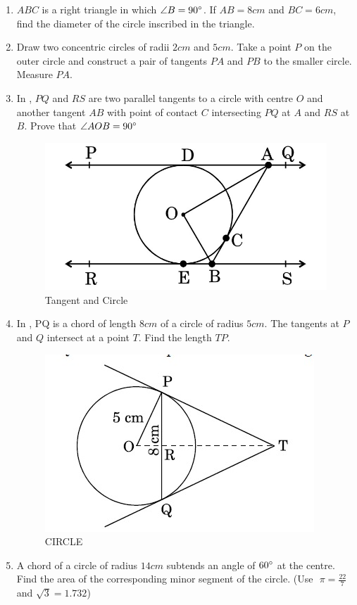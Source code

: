 \begin{enumerate}
\item $ABC$ is a right triangle in which $\angle B = 90\degree$. If $AB = 8 cm$ and $BC = 6 cm$, find the diameter of the circle inscribed in the triangle.

\item Draw two concentric circles of radii $2 cm$ and $5 cm$. Take a point $P$ on the outer circle and construct a pair of tangents $PA$ and $PB$ to the smaller circle. Measure $PA$.  


\item In  , $PQ$ and $RS$ are two parallel tangents to a circle with centre $O$ and another tangent $AB$ with point of contact $C$ intersecting $PQ$ at $A$ and $RS$ at $B$. Prove that $\angle AOB = 90 \degree$
\begin{figure}[H]
    \centering
    \includegraphics[width=\columnwidth]{figs/img3.jpg}
    \caption{Tangent and Circle}
    \label{fig:Figh_3}
\end{figure}

\item In , PQ is a chord of length $8 cm$ of a circle of radius $5 cm$. The tangents at $P$ and $Q$ intersect at a point $T$. Find the length $TP$.
\begin{figure}[H]
    \centering
    \includegraphics[width=\columnwidth]{figs/Screenshot2023-12-27160239.png}
    \caption{CIRCLE}
    \label{fig:Fig-2}
\end{figure}

\item A chord of a circle of radius $14 cm$ subtends an angle of $60\degree$ at the centre. Find the area of the corresponding minor segment of the circle.
({Use $\hspace{4pt}\pi=\frac{22}{7}$ and $\sqrt{3} = 1.732$})

\end{enumerate}
